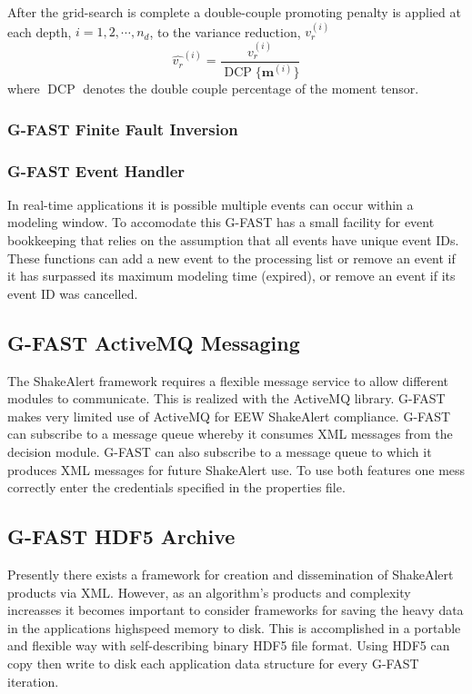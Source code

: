 \documentclass[12pt]{article}
\begin{document}
After the grid-search is complete a double-couple promoting penalty is applied at each depth,
$i=1,2,\cdots, n_{d}$, to the variance reduction, $v_r^{(i)}$ 
\begin{equation}
  \hat{v_r}^{(i)} = \frac{v_r^{(i)}}{\operatorname{DCP}\{\textbf{m}^{(i)}\}}
\end{equation}
where $\operatorname{DCP}$ denotes the double couple percentage of the moment tensor.  

\subsubsection{G-FAST Finite Fault Inversion}

\subsubsection{G-FAST Event Handler}
In real-time applications it is possible multiple events can occur within a modeling window.  
To accomodate this G-FAST has a small facility for event bookkeeping that
relies on the assumption that all events have unique event IDs.  
These functions can add a new event to the processing list or remove an event if it has surpassed
its maximum modeling time (expired), or remove an event if its event ID was cancelled.

\subsection{G-FAST ActiveMQ Messaging}\label{ss:gfastActiveMQ}
The ShakeAlert framework requires a flexible message service to allow different modules to
communicate.  This is realized with the ActiveMQ library.  G-FAST makes very limited use of
ActiveMQ for EEW ShakeAlert compliance.  G-FAST can subscribe to a message queue whereby it
consumes XML messages from the decision module.  
G-FAST can also subscribe to a message queue to which it produces XML messages for future 
ShakeAlert use.  To use both features one mess correctly enter the credentials specified
in the properties file. 

\subsection{G-FAST HDF5 Archive}\label{ss:gfastHDF5}
Presently there exists a framework for creation and dissemination of ShakeAlert products via
XML.  However, as an algorithm's products and complexity increasses it becomes important to consider
frameworks for saving the heavy data in the applications highspeed memory to disk.  This is
accomplished in a portable and flexible way with self-describing binary HDF5 file format.  Using
HDF5 can copy then write to disk each application data structure for every G-FAST iteration.
\end{document}
